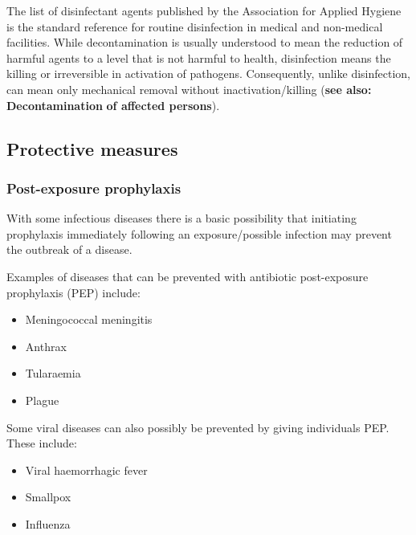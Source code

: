 \documentclass{article}
\begin{document}
The list of disinfectant agents published by the Association for Applied Hygiene is the standard reference for routine disinfection in medical and non-medical facilities. While decontamination is usually understood to mean the reduction of harmful agents to a level that is not harmful to health, disinfection means the killing or irreversible in activation of pathogens. Consequently, unlike disinfection, can mean only mechanical removal without inactivation/killing (\textbf{see also: Decontamination} \textbf{of affected persons}).


\subsection{Protective measures}\label{H7410551}



\subsubsection{Post-exposure prophylaxis}\label{H3851403}



With some infectious diseases there is a basic possibility that initiating prophylaxis immediately following an exposure/possible infection may prevent the outbreak of a disease.


Examples of diseases that can be prevented with antibiotic post-exposure prophylaxis (PEP) include:

\begin{itemize}
\item Meningococcal meningitis


\item Anthrax


\item Tularaemia


\item Plague


\end{itemize}

Some viral diseases can also possibly be prevented by giving individuals PEP. These include:

\begin{itemize}
\item Viral haemorrhagic fever


\item Smallpox


\item Influenza


\end{itemize}
\end{document}
